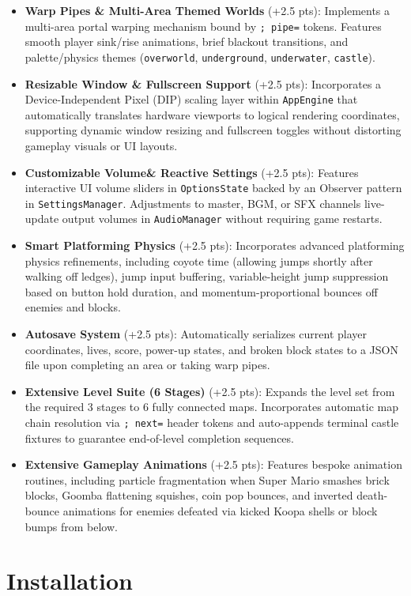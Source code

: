 \documentclass[12pt, a4paper]{article}
\begin{document}
\begin{itemize}
\item \textbf{Warp Pipes \& Multi-Area Themed Worlds} (+2.5 pts): Implements a multi-area portal warping mechanism bound by \texttt{; pipe=} tokens. Features smooth player sink/rise animations, brief blackout transitions, and palette/physics themes (\texttt{overworld}, \texttt{underground}, \texttt{underwater}, \texttt{castle}).
\item \textbf{Resizable Window \& Fullscreen Support} (+2.5 pts): Incorporates a Device-Independent Pixel (DIP) scaling layer within \texttt{AppEngine} that automatically translates hardware viewports to logical rendering coordinates, supporting dynamic window resizing and fullscreen toggles without distorting gameplay visuals or UI layouts.
\item \textbf{Customizable Volume\& Reactive Settings} (+2.5 pts): Features interactive UI volume sliders in \texttt{OptionsState} backed by an Observer pattern in \texttt{SettingsManager}. Adjustments to master, BGM, or SFX channels live-update output volumes in \texttt{AudioManager} without requiring game restarts.
\item \textbf{Smart Platforming Physics} (+2.5 pts): Incorporates advanced platforming physics refinements, including coyote time (allowing jumps shortly after walking off ledges), jump input buffering, variable-height jump suppression based on button hold duration, and momentum-proportional bounces off enemies and blocks.
\item \textbf{Autosave System} (+2.5 pts): Automatically serializes current player coordinates, lives, score, power-up states, and broken block states to a JSON file upon completing an area or taking warp pipes.
\item \textbf{Extensive Level Suite (6 Stages)} (+2.5 pts): Expands the level set from the required 3 stages to 6 fully connected maps. Incorporates automatic map chain resolution via \texttt{; next=} header tokens and auto-appends terminal castle fixtures to guarantee end-of-level completion sequences.
\item \textbf{Extensive Gameplay Animations} (+2.5 pts): Features bespoke animation routines, including particle fragmentation when Super Mario smashes brick blocks, Goomba flattening squishes, coin pop bounces, and inverted death-bounce animations for enemies defeated via kicked Koopa shells or block bumps from below.
\end{itemize}

\newpage

\section{Installation}
\end{document}
